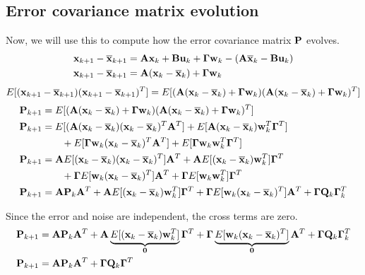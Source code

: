 \subsection{Error covariance matrix evolution}

Now, we will use this to compute how the \gls{error} covariance matrix $\mathbf{P}$
evolves.
\begin{align*}
  \mathbf{x}_{k+1} - \overline{\mathbf{x}}_{k+1} &= \mathbf{A}\mathbf{x}_k +
    \mathbf{B}\mathbf{u}_k + \mathbf{\Gamma}\mathbf{w}_k - (\mathbf{A}\overline{\mathbf{x}}_k -
    \mathbf{B}\mathbf{u}_k) \\
  \mathbf{x}_{k+1} - \overline{\mathbf{x}}_{k+1} &=
    \mathbf{A}(\mathbf{x}_k - \overline{\mathbf{x}}_k) + \mathbf{\Gamma}\mathbf{w}_k
\end{align*}
\begin{equation*}
  E[(\mathbf{x}_{k+1} - \overline{\mathbf{x}}_{k+1})(\mathbf{x}_{k+1} - \overline{\mathbf{x}}_{k+1})^T] =
    E[(\mathbf{A}(\mathbf{x}_k - \overline{\mathbf{x}}_k) + \mathbf{\Gamma}\mathbf{w}_k)
      (\mathbf{A}(\mathbf{x}_k - \overline{\mathbf{x}}_k) + \mathbf{\Gamma}\mathbf{w}_k)^T]
\end{equation*}
\begin{align*}
  \mathbf{P}_{k+1} &=
    E[(\mathbf{A}(\mathbf{x}_k - \overline{\mathbf{x}}_k) + \mathbf{\Gamma}\mathbf{w}_k)
      (\mathbf{A}(\mathbf{x}_k - \overline{\mathbf{x}}_k) + \mathbf{\Gamma}\mathbf{w}_k)^T] \\
  \mathbf{P}_{k+1} &=
    E[(\mathbf{A}(\mathbf{x}_k - \overline{\mathbf{x}}_k)(\mathbf{x}_k - \overline{\mathbf{x}}_k)^T
      \mathbf{A}^T] +
    E[\mathbf{A}(\mathbf{x}_k - \overline{\mathbf{x}}_k)\mathbf{w}_k^T\mathbf{\Gamma}^T] \\
    &\qquad + E[\mathbf{\Gamma}\mathbf{w}_k(\mathbf{x}_k - \overline{\mathbf{x}}_k)^T\mathbf{A}^T] +
    E[\mathbf{\Gamma}\mathbf{w}_k\mathbf{w}_k^T\mathbf{\Gamma}^T] \\
  \mathbf{P}_{k+1} &=
    \mathbf{A}E[(\mathbf{x}_k - \overline{\mathbf{x}}_k)(\mathbf{x}_k - \overline{\mathbf{x}}_k)^T]
    \mathbf{A}^T +
    \mathbf{A}E[(\mathbf{x}_k - \overline{\mathbf{x}}_k)\mathbf{w}_k^T]\mathbf{\Gamma}^T \\
    &\qquad + \mathbf{\Gamma} E[\mathbf{w}_k(\mathbf{x}_k - \overline{\mathbf{x}}_k)^T]\mathbf{A}^T +
    \mathbf{\Gamma} E[\mathbf{w}_k\mathbf{w}_k^T]\mathbf{\Gamma}^T \\
  \mathbf{P}_{k+1} &= \mathbf{A}\mathbf{P}_k\mathbf{A}^T +
    \mathbf{A}E[(\mathbf{x}_k - \overline{\mathbf{x}}_k)\mathbf{w}_k^T]\mathbf{\Gamma}^T +
    \mathbf{\Gamma} E[\mathbf{w}_k(\mathbf{x}_k - \overline{\mathbf{x}}_k)^T]\mathbf{A}^T +
    \mathbf{\Gamma}\mathbf{Q}_k\mathbf{\Gamma}_k^T
\end{align*}

Since the error and noise are independent, the cross terms are zero.
\begin{align*}
  \mathbf{P}_{k+1} &= \mathbf{A}\mathbf{P}_k\mathbf{A}^T +
    \mathbf{A}\underbrace{
      E[(\mathbf{x}_k - \overline{\mathbf{x}}_k)\mathbf{w}_k^T]}_{\mathbf{0}}\mathbf{\Gamma}^T +
    \mathbf{\Gamma}\underbrace{
      E[\mathbf{w}_k(\mathbf{x}_k - \overline{\mathbf{x}}_k)^T]}_{\mathbf{0}}\mathbf{A}^T +
    \mathbf{\Gamma}\mathbf{Q}_k\mathbf{\Gamma}_k^T \\
  \mathbf{P}_{k+1} &= \mathbf{A}\mathbf{P}_k\mathbf{A}^T +
    \mathbf{\Gamma}\mathbf{Q}_k\mathbf{\Gamma}^T
\end{align*}


